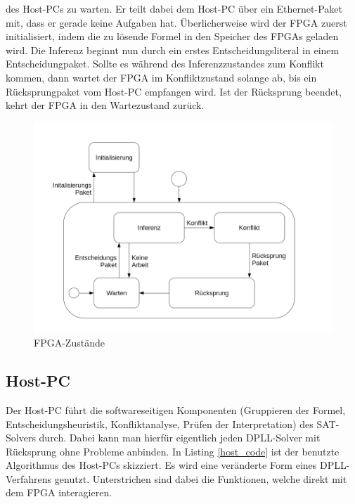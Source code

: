 des Host-PCs zu warten. Er teilt dabei dem Host-PC über
ein Ethernet-Paket mit, dass er gerade keine Aufgaben hat.
Überlicherweise wird der FPGA zuerst initialisiert, indem die zu lösende
Formel in den Speicher des FPGAs geladen wird. Die Inferenz beginnt
nun durch ein erstes Entscheidungsliteral in einem Entscheidungpaket.
Sollte es während des Inferenzzustandes zum Konflikt kommen, dann wartet
der FPGA im Konfliktzustand solange ab, bis ein Rücksprungpaket
vom Host-PC empfangen wird. Ist der Rücksprung beendet, kehrt
der FPGA in den Wartezustand zurück.
\begin{figure}[h]
  \includegraphics[width=\textwidth]{abb/state-chart.png}
  \caption{FPGA-Zustände}
  \label{modi}
\end{figure}

\subsection{Host-PC}
\label{host_pc}
Der Host-PC führt die softwareseitigen Komponenten (Gruppieren der Formel, Entscheidungsheuristik, 
Konfliktanalyse, Prüfen der Interpretation) des SAT-Solvers durch. 
Dabei kann man hierfür eigentlich jeden DPLL-Solver mit Rücksprung 
ohne Probleme anbinden. In Listing \ref{host_code} ist der benutzte Algorithmus des Host-PCs skizziert.
Es wird eine veränderte Form eines DPLL-Verfahrens genutzt.
Unterstrichen sind dabei die Funktionen, welche direkt mit dem FPGA interagieren.
\newpage
{}

